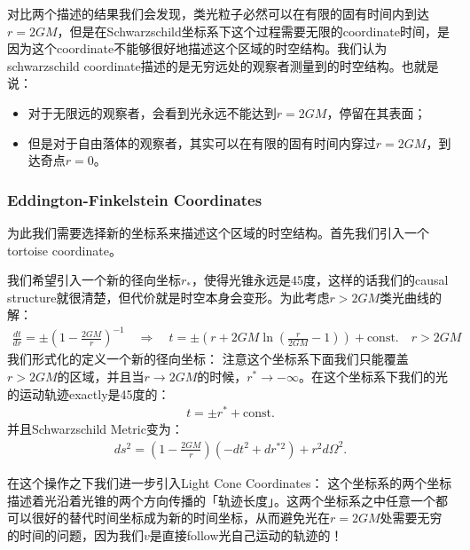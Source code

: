 \bigskip
{}

对比两个描述的结果我们会发现，类光粒子必然可以在有限的固有时间内到达$ r = 2GM
$，但是在Schwarzschild坐标系下这个过程需要无限的coordinate时间，是因为这个coordinate不能够很好地描述这个区域的时空结构。我们认为schwarzschild
coordinate描述的是无穷远处的观察者测量到的时空结构。也就是说：
\begin{itemize}
  \item 对于无限远的观察者，会看到光永远不能达到$ r = 2GM $，停留在其表面；
  \item 但是对于自由落体的观察者，其实可以在有限的固有时间内穿过$ r = 2GM $，到达奇点$ r = 0 $。
\end{itemize}

\subsubsection{Eddington-Finkelstein Coordinates}

为此我们需要选择新的坐标系来描述这个区域的时空结构。首先我们引入一个tortoise coordinate。

\bigskip
{}

我们希望引入一个新的径向坐标$ r_* $，使得光锥永远是45度，这样的话我们的causal
structure就很清楚，但代价就是时空本身会变形。为此考虑$ r> 2GM $类光曲线的解：
\begin{align}
  \frac{dt}{dr}=\pm\left(1-\frac{2GM}{r}\right)^{-1} \quad
  \Rightarrow \quad t = \pm \left(r + 2GM \ln\left(\frac{r}{2GM} -
  1\right)\right) + \text{const}. \quad r>2GM
\end{align}
我们形式化的定义一个新的径向坐标：
注意这个坐标系下面我们只能覆盖$ r > 2GM $的区域，并且当$ r \to 2GM $的时候，$ r^* \to -\infty
$。在这个坐标系下我们的光的运动轨迹exactly是45度的：
\begin{align}
  t = \pm r^* + \text{const}.
\end{align}
并且Schwarzschild Metric变为：
\begin{align}
  ds^2=\left(1-\frac{2GM}{r}\right)(-dt^2+dr^{*2})+r^2d\Omega^2.
\end{align}

\bigskip
{}

在这个操作之下我们进一步引入Light Cone Coordinates：
这个坐标系的两个坐标描述着光沿着光锥的两个方向传播的「轨迹长度」。这两个坐标系之中任意一个都可以很好的替代时间坐标成为新的时间坐标，从而避免光在$
r = 2GM $处需要无穷的时间的问题，因为我们$ v $是直接follow光自己运动的轨迹的！

